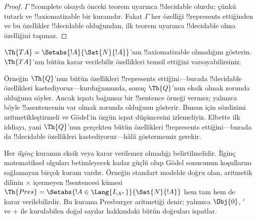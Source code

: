 \begin{proof}
$\Gamma$ !!{complete} olsaydı önceki teorem uyarınca !!{decidable} olurdu;
çünkü tutarlı ve !!{axiomatizable} bir kuramdır. Fakat $\Gamma$ her özelliği
!!{represents} ettiğinden ve bu özellikler !!{decidable} olduğundan, ilk
teorem uyarınca !!{decidable} olma özelliğini taşımaz.
\end{proof}

\begin{prob}
$\Th{TA} = \Setabs{!A}{\Sat{N}{!A}}$'nın !!{axiomatizable} olmadığını
gösterin. $\Th{TA}$'nın bütün karar verilebilir özellikleri temsil ettiğini
varsayabilirsiniz.
\end{prob}

Örneğin $\Th{Q}$'nun bütün özellikleri !!{represents} ettiğini---burada
!!{decidable} özellikleri kastediyoruz---kurduğumuzda, sonuç $\Th{Q}$'nun
eksik olmak zorunda olduğunu söyler. Ancak
ispatı bağımsız bir !!{sentence} örneği vermez; yalnızca böyle !!a{sentence}{}nin
var olmak zorunda olduğunu gösterir. Bunun için sözdizimi aritmetikleştirmeli
ve G\"odel'in özgün ispat düşüncesini izlemeliyiz. Elbette ilk iddiayı, yani
$\Th{Q}$'nun gerçekten bütün özellikleri !!{represents} ettiğini---burada da
!!{decidable} özellikleri kastediyoruz---hâlâ göstermemiz gerekir.

Her \emph{ilginç} kuramın eksik veya karar verilemez olmadığı belirtilmelidir.
İlginç matematiksel olguları betimleyecek kadar güçlü olup G\"odel sonucunun
koşullarını sağlamayan birçok kuram vardır. Örneğin standart modelde doğru
olan, aritmetik dilinin $\times$ içermeyen !!{sentence}s{}i kümesi
$\Th{Pres} = \Setabs{!A \in \Lang{L_{A^+}}}{\Sat{N}{!A}}$ hem tam hem de
karar verilebilirdir. Bu kurama Presburger aritmetiği denir; yalnızca
$\Obj{0}$, $\prime$ ve $+$ ile kurulabilen doğal sayılar hakkındaki bütün
doğruları ispatlar.

